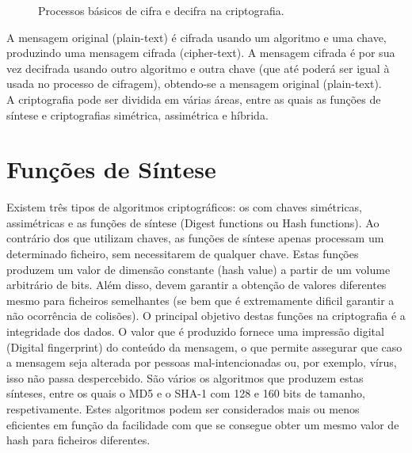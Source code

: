 \documentclass[a4paper,11pt,openright,oneside]{report}
\begin{document}
\begin{figure}[ht]
\center
{}
\caption{Processos básicos de cifra e decifra na criptografia.}
\label{fig:crypto0}
\end{figure}

A mensagem original (plain-text) é cifrada usando um algoritmo e uma chave, produzindo uma mensagem cifrada (cipher-text). A mensagem cifrada é por sua vez decifrada usando outro algoritmo e outra chave (que até poderá ser igual à usada no processo de cifragem), obtendo-se a mensagem original (plain-text).\\

A criptografia pode ser dividida em várias áreas, entre as quais as funções de síntese e criptografias simétrica, assimétrica e híbrida.

\section{Funções de Síntese}

Existem três tipos de algoritmos criptográficos: os com chaves simétricas, assimétricas e as funções de síntese (Digest functions ou Hash functions). Ao contrário dos que utilizam chaves, as funções de síntese apenas processam um determinado ficheiro, sem necessitarem de qualquer chave. Estas funções produzem um valor de dimensão constante (hash value) a partir de um volume arbitrário de bits. Além disso, devem garantir a obtenção de valores diferentes mesmo para ficheiros semelhantes (se bem que é extremamente dificil garantir a não ocorrência de colisões). O principal objetivo destas funções na criptografia é a integridade dos dados. O valor que é produzido fornece uma impressão digital (Digital fingerprint) do conteúdo da mensagem, o que permite assegurar que caso a mensagem seja alterada por pessoas mal-intencionadas ou, por exemplo, vírus, isso não passa despercebido. São vários os algoritmos que produzem estas sínteses, entre os quais o MD5 e o SHA-1 com 128 e 160 bits de tamanho, respetivamente. Estes algoritmos podem ser considerados mais ou menos eficientes em função da facilidade com que se consegue obter um mesmo valor de hash para ficheiros diferentes.\\
\end{document}
